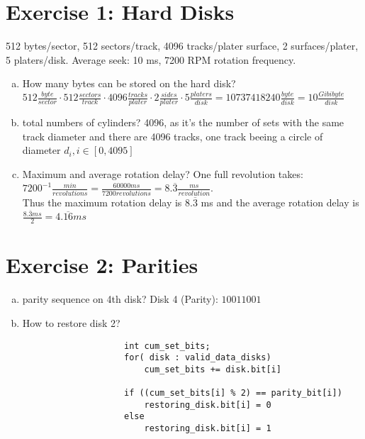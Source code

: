\documentclass[a4paper]{article}
\begin{document}
	\section*{Exercise 1: Hard Disks}\label{sec:exercise1}
    512 bytes/sector, 512 sectors/track, 4096 tracks/plater surface, 2 surfaces/plater, 5 platers/disk. Average seek: 10 ms, 7200 RPM rotation frequency.
	\begin{enumerate}[a.]
		\item How many bytes can be stored on the hard disk?
            $ 512 \frac{byte}{sector} \cdot 512 \frac{sectors}{track} \cdot 4096 \frac{tracks}{plater} \cdot 2 \frac{sides}{plater} \cdot 5 \frac{platers}{disk} = 10737418240  \frac{byte}{disk} = 10 \frac{Gibibyte}{disk}$
        \item total numbers of cylinders? 
            4096, as it's the number of sets with the same track diameter and there are 4096 tracks, one track beeing a circle of diameter $d_i, i \in [0,4095]$
        \item Maximum and average rotation delay?
            One full revolution takes: $7200^{-1} \frac{min}{revolutions} = \frac{60000 ms}{7200 revolutions} = 8.\overline{3} \frac{ms}{revolution}$. \\
            Thus the maximum rotation delay is $8.\overline{3}$ ms and the average rotation delay is $\frac{8.\overline{3} ms}{2} = 4.\overline{16} ms$
	\end{enumerate}

	\section*{Exercise 2: Parities}\label{sec:exercise2}
        \begin{enumerate}[a.]
            \item parity sequence on 4th disk?
                Disk 4 (Parity): $10011001$
            \item How to restore disk 2?
                \begin{lstlisting}
                    int cum_set_bits;
                    for( disk : valid_data_disks)
                        cum_set_bits += disk.bit[i] 
                    
                    if ((cum_set_bits[i] % 2) == parity_bit[i])
                        restoring_disk.bit[i] = 0
                    else 
                        restoring_disk.bit[i] = 1
                \end{lstlisting}
        \end{enumerate}
\end{document}
